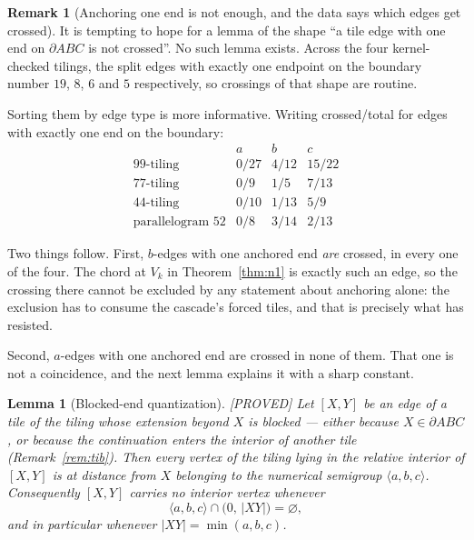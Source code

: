 \documentclass[11pt,reqno]{amsart}
\theoremstyle{plain}
\newtheorem{lemma}[theorem]{Lemma}
\theoremstyle{definition}
\newtheorem{remark}[theorem]{Remark}
\newcommand{\lab}[1]{\hfill\textnormal{\footnotesize\textsc{[#1]}}}
\begin{document}
\begin{remark}[Anchoring one end is not enough, and the data says which edges get crossed]\label{rem:onlyanchor}
It is tempting to hope for a lemma of the shape ``a tile edge with one end on $\partial ABC$ is not
crossed''. No such lemma exists. Across the four kernel-checked tilings, the split edges with exactly
one endpoint on the boundary number $19$, $8$, $6$ and $5$ respectively, so crossings of that shape
are routine.

Sorting them by edge type is more informative. Writing crossed/total for edges with exactly one end
on the boundary:
\[
\begin{array}{lccc}
 & a & b & c\\
\text{99-tiling} & 0/27 & 4/12 & 15/22\\
\text{77-tiling} & 0/9 & 1/5 & 7/13\\
\text{44-tiling} & 0/10 & 1/13 & 5/9\\
\text{parallelogram 52} & 0/8 & 3/14 & 2/13
\end{array}
\]

Two things follow. First, $b$-edges with one anchored end \emph{are} crossed, in every one of the
four. The chord at $V_k$ in Theorem~\ref{thm:n1} is exactly such an edge, so the crossing there
cannot be excluded by any statement about anchoring alone: the exclusion has to consume the cascade's
forced tiles, and that is precisely what has resisted.

Second, $a$-edges with one anchored end are crossed in none of them. That one is not a coincidence,
and the next lemma explains it with a sharp constant.
\end{remark}

\begin{lemma}[Blocked-end quantization]\label{lem:anchorclear}\lab{PROVED}
Let $[X,Y]$ be an edge of a tile of the tiling whose extension beyond $X$ is blocked --- either
because $X\in\partial ABC$, or because the continuation enters the interior of another tile
(Remark~\ref{rem:tib}). Then every vertex of the tiling lying in the relative interior of $[X,Y]$ is
at distance from $X$ belonging to the numerical semigroup $\langle a,b,c\rangle$. Consequently
$[X,Y]$ carries no interior vertex whenever
\[
\langle a,b,c\rangle\cap\bigl(0,\,|XY|\bigr)=\varnothing ,
\]
and in particular whenever $|XY|=\min(a,b,c)$.
\end{lemma}
\end{document}
